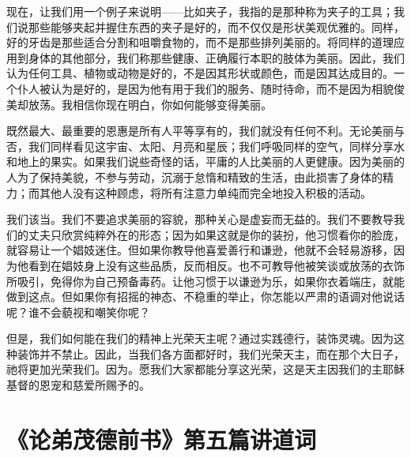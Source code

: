现在，让我们用一个例子来说明——比如夹子，我指的是那种称为夹子的工具；我们说那些能够夹起并握住东西的夹子是好的，而不仅仅是形状美观优雅的。同样，好的牙齿是那些适合分割和咀嚼食物的，而不是那些排列美丽的。将同样的道理应用到身体的其他部分，我们称那些健康、正确履行本职的肢体为美丽。因此，我们认为任何工具、植物或动物是好的，不是因其形状或颜色，而是因其达成目的。一个仆人被认为是好的，是因为他有用于我们的服务、随时待命，而不是因为相貌俊美却放荡。我相信你现在明白，你如何能够变得美丽。\par

既然最大、最重要的恩惠是所有人平等享有的，我们就没有任何不利。无论美丽与否，我们同样看见这宇宙、太阳、月亮和星辰；我们呼吸同样的空气，同样分享水和地上的果实。如果我们说些奇怪的话，平庸的人比美丽的人更健康。因为美丽的人为了保持美貌，不参与劳动，沉溺于怠惰和精致的生活，由此损害了身体的精力；而其他人没有这种顾虑，将所有注意力单纯而完全地投入积极的活动。\par

我们该当。我们不要追求美丽的容貌，那种关心是虚妄而无益的。我们不要教导我们的丈夫只欣赏纯粹外在的形态；因为如果这就是你的装扮，他习惯看你的脸庞，就容易让一个娼妓迷住。但如果你教导他喜爱善行和谦逊，他就不会轻易游移，因为他看到在娼妓身上没有这些品质，反而相反。也不可教导他被笑谈或放荡的衣饰所吸引，免得你为自己预备毒药。让他习惯于以谦逊为乐，如果你衣着端庄，就能做到这点。但如果你有招摇的神态、不稳重的举止，你怎能以严肃的语调对他说话呢？谁不会藐视和嘲笑你呢？\par

但是，我们如何能在我们的精神上光荣天主呢？通过实践德行，装饰灵魂。因为这种装饰并不禁止。因此，当我们各方面都好时，我们光荣天主，而在那个大日子，祂将更加光荣我们。因为。愿我们大家都能分享这光荣，这是天主因我们的主耶稣基督的恩宠和慈爱所赐予的。\par



\section{《论弟茂德前书》第五篇讲道词}

